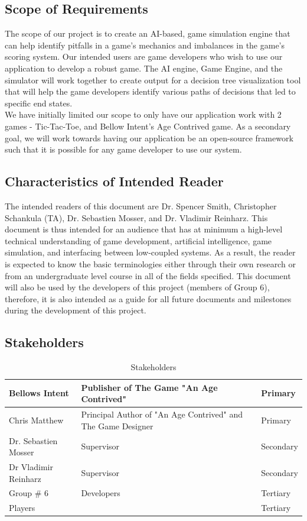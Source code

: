 \documentclass[12pt]{article}
\begin{document}
\subsection{Scope of Requirements} 

The scope of our project is to create an AI-based, game simulation engine that can help identify pitfalls in a game’s mechanics and imbalances in the game’s scoring system. Our intended users are game developers who wish to use our application to develop a robust game. The AI engine, Game Engine, and the simulator will work together to create output for a decision tree visualization tool that will help the game developers identify various paths of decisions that led to specific end states. 
\\We have initially limited our scope to only have our application work with 2 games - Tic-Tac-Toe, and Bellow Intent’s Age Contrived game. As a secondary goal, we will work towards having our application be an open-source framework such that it is possible for any game developer to use our system.


\subsection{Characteristics of Intended Reader} \label{sec_IntendedReader}
The intended readers of this document are Dr. Spencer Smith, Christopher Schankula (TA), Dr. Sebastien Mosser, and Dr. Vladimir Reinharz. This document is thus intended for an audience that has at minimum a high-level technical understanding of game development, artificial intelligence, game simulation, and interfacing between low-coupled systems. As a result, the reader is expected to know the basic terminologies either through their own research or from an undergraduate level course in all of the fields specified. This document will also be used by the developers of this project (members of Group 6), therefore, it is also intended as a guide for all future documents and milestones during the development of this project.
\newpage
\subsection{Stakeholders}
\begin{table}[h!]
\caption{Stakeholders} \label{Stakeholders}
\begin{tabularx}{\textwidth}{p{5cm}p{5cm}p{1.5cm}}
\toprule
Bellows Intent & Publisher of The Game "An Age Contrived" & Primary\\
\midrule
Chris Matthew & Principal Author of "An Age Contrived" and The Game Designer & Primary\\
\midrule
Dr. Sebastien Mosser & Supervisor & Secondary\\
\midrule
Dr Vladimir Reinharz & Supervisor & Secondary\\
\midrule
Group \# 6 & Developers & Tertiary\\
\midrule
Players & & Tertiary\\
\bottomrule
\end{tabularx}
\end{table}
\end{document}
